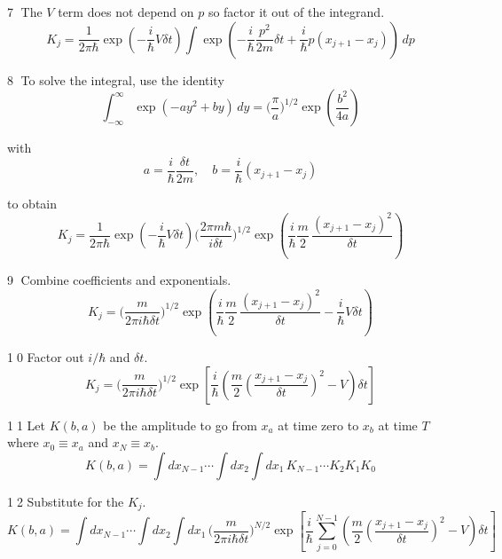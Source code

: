 \documentclass[12pt]{article}
\begin{document}
\textcircled{\scriptsize7}
The $V$ term does not depend on $p$ so factor it out of the integrand.
\begin{equation*}
K_j=\frac{1}{2\pi\hbar}
\exp\left(-\frac{i}{\hbar}V\delta t\right)
\int\exp\left(-\frac{i}{\hbar}
\frac{p^2}{2m}
\delta t
+\frac{i}{\hbar}p(x_{j+1}-x_j)\right)
\,dp
\end{equation*}

\textcircled{\scriptsize8}
To solve the integral, use the identity
\begin{equation*}
\int_{-\infty}^\infty\exp(-ay^2+by)\,dy=\biggl(\frac{\pi}{a}\biggr)^{1/2}
\exp\left(\frac{b^2}{4a}\right)
\end{equation*}

with
\begin{equation*}
a=\frac{i}{\hbar}\frac{\delta t}{2m},\quad b=\frac{i}{\hbar}(x_{j+1}-x_j)
\end{equation*}

to obtain
\begin{equation*}
K_j=\frac{1}{2\pi\hbar}
\exp\left(-\frac{i}{\hbar}V\delta t\right)
\biggl(\frac{2\pi m\hbar}{i\delta t}\biggr)^{1/2}
\exp\left(\frac{i}{\hbar}\frac{m}{2}\,\frac{(x_{j+1}-x_j)^2}{\delta t}\right)
\end{equation*}

\textcircled{\scriptsize9}
Combine coefficients and exponentials.
\begin{equation*}
K_j=\biggl(\frac{m}{2\pi i\hbar\delta t}\biggr)^{1/2}
\exp\left(\frac{i}{\hbar}\frac{m}{2}\,\frac{(x_{j+1}-x_j)^2}{\delta t}-\frac{i}{\hbar}V\delta t\right)
\end{equation*}

\textcircled{\scriptsize10}
Factor out $i/\hbar$ and $\delta t$.
\begin{equation*}
K_j=\biggl(\frac{m}{2\pi i\hbar\delta t}\biggr)^{1/2}
\exp\left[\frac{i}{\hbar}
\left(\frac{m}{2}\left(\frac{x_{j+1}-x_j}{\delta t}\right)^2-V\right)\delta t
\right]
\end{equation*}

\textcircled{\scriptsize11}
Let $K(b,a)$ be the amplitude to go from $x_a$ at time zero to
$x_b$ at time $T$ where $x_0\equiv x_a$ and $x_N\equiv x_b$.
\begin{equation*}
K(b,a)=\int dx_{N-1}\cdots\int dx_2\int dx_1\,
K_{N-1}\cdots K_2K_1K_0
\end{equation*}

\textcircled{\scriptsize12}
Substitute for the $K_j$.
\begin{equation*}
K(b,a)=\int dx_{N-1}\cdots\int dx_2\int dx_1\,
\biggl(\frac{m}{2\pi i\hbar\delta t}\biggr)^{N/2}
\exp\left[
\frac{i}{\hbar}\sum_{j=0}^{N-1}\left(
\frac{m}{2}\left(\frac{x_{j+1}-x_j}{\delta t}\right)^2
-V\right)\delta t
\right]
\end{equation*}
\end{document}
